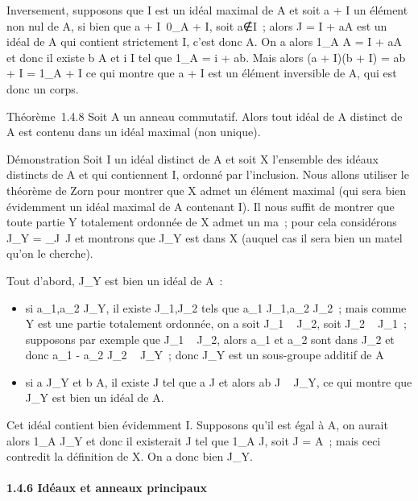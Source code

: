 \documentclass[]{article}
\begin{document}
Inversement, supposons que I est un idéal maximal de A et soit a + I un
élément non nul de A\diagupI, si bien que a +
I\neq~0\_A + I, soit
a∉I~; alors J = I + aA est un idéal de A qui
contient strictement I, c'est donc A. On a alors 1\_A \in A = I +
aA et donc il existe b \in A et i \in I tel que 1\_A = i + ab. Mais
alors (a + I)(b + I) = ab + I = 1\_A + I ce qui montre que a + I
est un élément inversible de A\diagupI, qui est donc un corps.

Théorème~1.4.8 Soit A un anneau commutatif. Alors tout idéal de A
distinct de A est contenu dans un idéal maximal (non unique).

Démonstration Soit I un idéal distinct de A et soit X l'ensemble des
idéaux distincts de A et qui contiennent I, ordonné par l'inclusion.
Nous allons utiliser le théorème de Zorn pour montrer que X admet un
élément maximal (qui sera bien évidemment un idéal maximal de A
contenant I). Il nous suffit de montrer que toute partie Y totalement
ordonnée de X admet un ma\jmathorant~; pour cela considérons J\_Y
= \⋃  \_J\inY~J
et montrons que J\_Y est dans X (auquel cas il sera bien un
ma\jmathorant tel qu'on le cherche).

Tout d'abord, J\_Y est bien un idéal de A~:

\begin{itemize}
\itemsep1pt\parskip0pt
\item
  si a\_1,a\_2 \in J\_Y, il existe
  J\_1,J\_2 \inY tels que a\_1 \in
  J\_1,a\_2 \in J\_2~; mais comme Y est une partie
  totalement ordonnée, on a soit J\_1 \subset~ J\_2, soit
  J\_2 \subset~ J\_1~; supposons par exemple que J\_1 \subset~
  J\_2, alors a\_1 et a\_2 sont dans
  J\_2 et donc a\_1 - a\_2 \in J\_2 \subset~
  J\_Y~; donc J\_Y est un sous-groupe additif de A
\item
  si a \in J\_Y et b \in A, il existe J \inY tel que a \in J et alors ab
  \in J \subset~ J\_Y, ce qui montre que J\_Y est bien un idéal
  de A.
\end{itemize}

Cet idéal contient bien évidemment I. Supposons qu'il est égal à A, on
aurait alors 1\_A \in J\_Y et donc il existerait J \inY tel
que 1\_A \in J, soit J = A~; mais ceci contredit la définition de
X. On a donc bien J\_Y\inX.

\paragraph{1.4.6 Idéaux et anneaux principaux}
\end{document}
